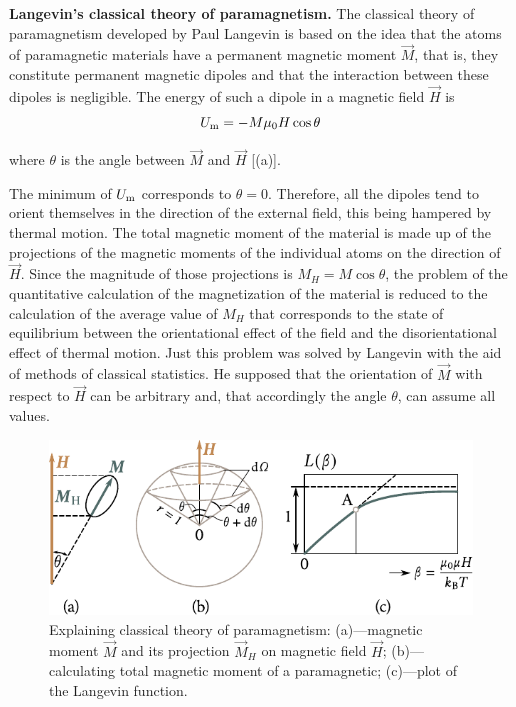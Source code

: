 \textbf{Langevin's classical theory of paramagnetism.} The classical theory of paramagnetism developed by Paul Langevin is based on the idea that the atoms of paramagnetic materials have a permanent magnetic moment $\vec{M}$, that is, they constitute permanent magnetic dipoles and that the interaction between these dipoles is negligible. The energy of such a dipole in a magnetic field $\vec{H}$ is
\begin{equation}\label{eq:7_45}
    U_{\text{m}} = - M \mu_0 H \cos\theta
\end{equation}

\noindent
where $\theta$ is the angle between $\vec{M}$ and $\vec{H}$ [(a)].

The minimum of $U_{\text{m}}$ corresponds to $\theta=0$. Therefore, all the dipoles tend to orient themselves in the direction of the external field, this being hampered by thermal motion. The total magnetic moment of the material is made up of the projections of the magnetic moments of the individual atoms on the direction of $\vec{H}$. Since the magnitude of those projections is $M_H=M\cos\theta$, the problem of the quantitative calculation of the magnetization of the material is reduced to the calculation of the average value of $M_H$ that corresponds to the state of equilibrium between the orientational effect of the field and the disorientational effect of thermal motion. Just this problem was solved by Langevin with the aid of methods of classical statistics. He supposed that the orientation of $\vec{M}$ with respect to $\vec{H}$ can be arbitrary and, that accordingly the angle $\theta$, can assume all values.

\begin{figure}[t]
	\begin{center}
		\includegraphics[scale=1]{figures/ch_07/fig_7_12.pdf}
		\caption[]{Explaining classical theory of paramagnetism: (a)---magnetic moment $\vec{M}$ and its projection $\vec{M}_H$ on magnetic field $\vec{H}$; (b)---calculating total magnetic moment of a paramagnetic; (c)---plot of the Langevin function.}
		\label{fig:7_12}
	\end{center}
	\vspace{-0.7cm}
\end{figure}

